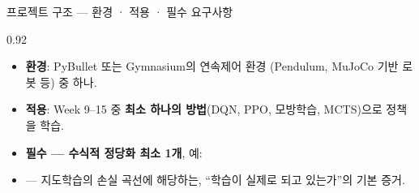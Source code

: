 \begin{frame}{프로젝트 구조 — 환경 · 적용 · 필수 요구사항}
\begin{center}\begin{varwidth}{0.92\textwidth}
  \begin{itemize}
    \item \textbf{환경}: PyBullet 또는 Gymnasium의 연속제어 환경
      (Pendulum, MuJoCo 기반 로봇 등) 중 하나.
    \item \textbf{적용}: Week 9--15 중 \textbf{최소 하나의 방법}(DQN, PPO,
      모방학습, MCTS)으로 정책을 학습.
    \item \textbf{필수 — 수식적 정당화 최소 1개}, 예:
      
    \item {} — 지도학습의
      손실 곡선에 해당하는, ``학습이 실제로 되고 있는가''의 기본 증거.
  \end{itemize}
\end{varwidth}\end{center}
\end{frame}
